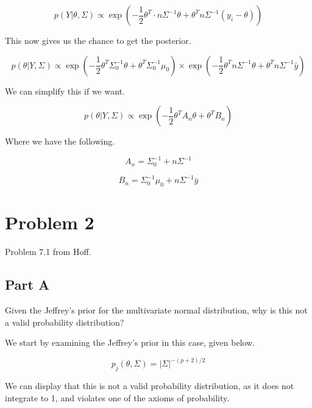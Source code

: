 \documentclass[12pt, letterpaper]{article}
\begin{document}
\begin{equation}
  p(Y | \theta, \Sigma) \propto \exp( -\frac{1}{2} \theta^T \cdot n \Sigma^{-1} \theta + \theta^T n \Sigma^{-1} (y_i - \theta))
\end{equation} 

This now gives us the chance to get the posterior. 

\begin{equation}
  p(\theta | Y, \Sigma) \propto \exp( -\frac{1}{2} \theta^T \Sigma_0^{-1} \theta + \theta^T \Sigma_0^{-1} \mu_0) \times \exp(-\frac{1}{2} \theta^T n \Sigma^{-1} \theta + \theta^T n \Sigma^{-1} \bar{y})
\end{equation} 

We can simplify this if we want. 

\begin{equation} 
  p(\theta | Y, \Sigma) \propto \exp( -\frac{1}{2} \theta^T A_n \theta + \theta^T B_n)
\end{equation} 

Where we have the following. 

\begin{equation}
  A_n = \Sigma_0^{-1} + n \Sigma^{-1} 
\end{equation} 

\begin{equation}
  B_n = \Sigma_0^{-1} \mu_0 + n \Sigma^{-1} \bar{y} 
\end{equation} 

\section{Problem 2}

Problem 7.1 from Hoff. 

\subsection{Part A} 

Given the Jeffrey's prior for the multivariate normal distribution, why is this not a valid probability distribution? 

We start by examining the Jeffrey's prior in this case, given below. 

\begin{equation}
  p_j(\theta, \Sigma) = |\Sigma|^{-(p+2)/2}
\end{equation} 

We can display that this is not a valid probability distribution, as it does not integrate to 1, and violates one of the axioms of probability. 
\end{document}
